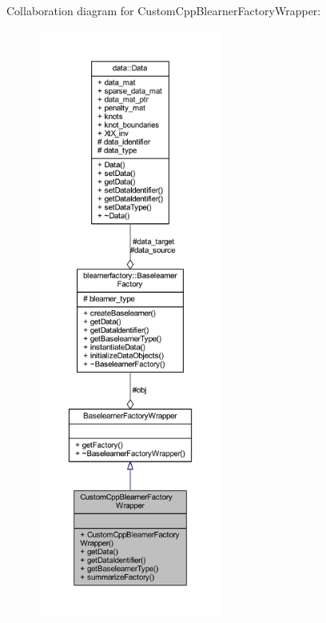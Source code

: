 Collaboration diagram for Custom\+Cpp\+Blearner\+Factory\+Wrapper\+:
\nopagebreak
\begin{figure}[H]
\begin{center}
\leavevmode
\includegraphics[height=550pt]{class_custom_cpp_blearner_factory_wrapper__coll__graph}
\end{center}
\end{figure}
